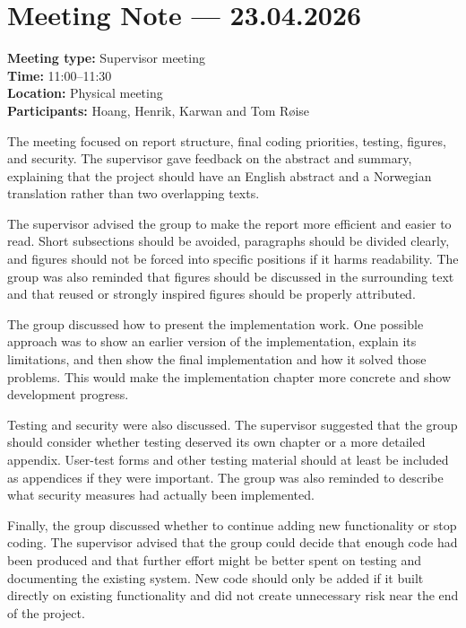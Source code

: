 \section{Meeting Note --- 23.04.2026}
\label{app:meeting-2026-04-23}
\textbf{Meeting type:} Supervisor meeting\\
\textbf{Time:} 11:00--11:30\\
\textbf{Location:} Physical meeting\\
\textbf{Participants:} Hoang, Henrik, Karwan and Tom Røise

The meeting focused on report structure, final coding priorities, testing, figures, and security. The supervisor gave feedback on the abstract and summary, explaining that the project should have an English abstract and a Norwegian translation rather than two overlapping texts.

The supervisor advised the group to make the report more efficient and easier to read. Short subsections should be avoided, paragraphs should be divided clearly, and figures should not be forced into specific positions if it harms readability. The group was also reminded that figures should be discussed in the surrounding text and that reused or strongly inspired figures should be properly attributed.

The group discussed how to present the implementation work. One possible approach was to show an earlier version of the implementation, explain its limitations, and then show the final implementation and how it solved those problems. This would make the implementation chapter more concrete and show development progress.

Testing and security were also discussed. The supervisor suggested that the group should consider whether testing deserved its own chapter or a more detailed appendix. User-test forms and other testing material should at least be included as appendices if they were important. The group was also reminded to describe what security measures had actually been implemented.

Finally, the group discussed whether to continue adding new functionality or stop coding. The supervisor advised that the group could decide that enough code had been produced and that further effort might be better spent on testing and documenting the existing system. New code should only be added if it built directly on existing functionality and did not create unnecessary risk near the end of the project.
